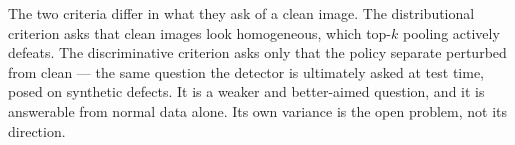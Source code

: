  The two criteria differ in what they ask of a clean image. The
distributional criterion asks that clean images look homogeneous, which top-$k$
pooling actively defeats. The discriminative criterion asks only that the policy
separate perturbed from clean --- the same question the detector is ultimately
asked at test time, posed on synthetic defects. It is a weaker and better-aimed
question, and it is answerable from normal data alone. Its own variance is the
open problem, not its direction.
